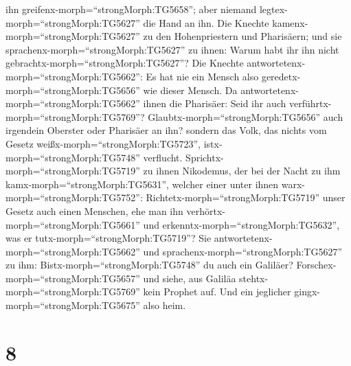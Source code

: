 ihn greifenx-morph=``strongMorph:TG5658''; aber niemand
legtex-morph=``strongMorph:TG5627'' die Hand an ihn.  Die
Knechte kamenx-morph=``strongMorph:TG5627'' zu den Hohenpriestern und
Pharisäern; und sie sprachenx-morph=``strongMorph:TG5627'' zu ihnen:
Warum habt ihr ihn nicht gebrachtx-morph=``strongMorph:TG5627''?
 Die Knechte antwortetenx-morph=``strongMorph:TG5662'': Es
hat nie ein Mensch also geredetx-morph=``strongMorph:TG5656'' wie dieser
Mensch.  Da antwortetenx-morph=``strongMorph:TG5662'' ihnen
die Pharisäer: Seid ihr auch verführtx-morph=``strongMorph:TG5769''?
 Glaubtx-morph=``strongMorph:TG5656'' auch irgendein
Oberster oder Pharisäer an ihn?  sondern das Volk, das
nichts vom Gesetz weißx-morph=``strongMorph:TG5723'',
istx-morph=``strongMorph:TG5748'' verflucht. 
Sprichtx-morph=``strongMorph:TG5719'' zu ihnen Nikodemus, der bei der
Nacht zu ihm kamx-morph=``strongMorph:TG5631'', welcher einer unter
ihnen warx-morph=``strongMorph:TG5752'': 
Richtetx-morph=``strongMorph:TG5719'' unser Gesetz auch einen Menschen,
ehe man ihn verhörtx-morph=``strongMorph:TG5661'' und
erkenntx-morph=``strongMorph:TG5632'', was er
tutx-morph=``strongMorph:TG5719''?  Sie
antwortetenx-morph=``strongMorph:TG5662'' und
sprachenx-morph=``strongMorph:TG5627'' zu ihm:
Bistx-morph=``strongMorph:TG5748'' du auch ein Galiläer?
Forschex-morph=``strongMorph:TG5657'' und siehe, aus Galiläa
stehtx-morph=``strongMorph:TG5769'' kein Prophet auf.  Und
ein jeglicher gingx-morph=``strongMorph:TG5675'' also heim.

\hypertarget{section-7}{%
\section{8}\label{section-7}}

